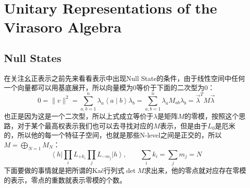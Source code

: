 \section{Unitary Representations of the Virasoro Algebra}
\subsection{Null States}
在关注幺正表示之前先来看看表示中出现Null State的条件，由于线性空间中任何一个向量都可以用基底展开，所以向量模为0等价于下面的二次型为0：
\begin{equation}
	0=\|v\|^2=\sum_{a,b=1}^n\lambda_a\left<a\mid b\right>\lambda_b=\sum_{a,b=1}^n\lambda_aM_{ab}\lambda_b=\vec{\lambda}^TM\vec{\lambda}
\end{equation}
也正是因为这是一个二次型，所以上式成立等价于$\lambda$是矩阵$M$的零模，按照这个思路，对于某个最高权表示我们也可以去寻找对应的$M$表示，但是由于$L_0$是厄米的，所以他的每一个特征子空间，也就是那些N-level之间是正交的，所以$M=\bigoplus_{N=1} M_N$：
\begin{equation}
	\left<h\right|\prod_iL_{+k_i}\left.\prod_jL_{-m_j}\left|h\right>,\quad\quad\sum_ik_i=\sum_jm_j=N\right. 
\end{equation}
下面要做的事情就是把所谓的Ka\v{c}行列式$\det M$求出来，他的零点就对应存在零模的表示，零点的重数就表示零模的个数。
